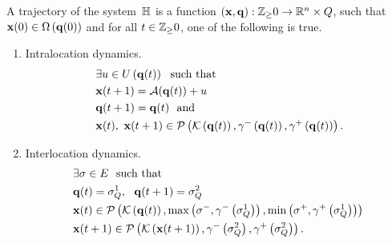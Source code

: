 A trajectory of the system~$\mathbb{H}$ is a function
$\left({\bf x},{\bf q}\right):\mathbb{Z}_\geq 0\rightarrow\mathbb{R}^n\times Q$, such
that ${\bf x}(0)\in\Omega\left({\bf q}(0)\right)$ and for all
$t\in\mathbb{Z}_\geq 0$, one of the following is true.
\begin{enumerate}
\item Intralocation dynamics.
\begin{align}~\label{eqn:intralocation}
\begin{split}
& \exists u\in U\left({\bf q}(t)\right)~~\text{such that}\\
& {\bf x}(t+1) = \mathcal{A}({\bf q}(t))+u\\ 
& {\bf q}(t+1) = {\bf q}(t)~~
\text{and}\\
& {\bf x}(t),~{\bf x}(t+1)\in\mathcal{P}\left(\mathcal{K}\left({\bf q}(t)\right),\gamma^-\left({\bf q}(t)\right),\gamma^+\left({\bf q}(t)\right)\right).
\end{split}
\end{align}
\item Interlocation dynamics.
\begin{align} 
\begin{split}
& \exists \sigma\in E~~\text{such that}\\
& {\bf q}(t)=\sigma^1_{Q},~~{\bf q}(t+1)=\sigma^2_{Q}\\
& {\bf x}(t)\in\mathcal{P}\left(\mathcal{K}\left({\bf q}(t)\right),\max\left(\sigma^-,\gamma^-\left(\sigma^1_{Q}\right)\right),\min\left(\sigma^+,\gamma^+\left(\sigma^1_{Q}\right)\right)\right)\\
& {\bf x}(t+1)\in \mathcal{P}\left(\mathcal{K}\left({\bf x}(t+1)\right),\gamma^-\left(\sigma^2_{Q}\right),\gamma^+\left(\sigma^2_{Q}\right)\right).
\end{split}
\end{align}
\end{enumerate}

